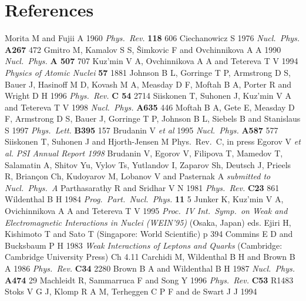 \documentclass[12pt]{iopart}
\begin{document}
\section*{References}
\begin{thebibliography}{99}
 Morita M and Fujii A 1960 {\em Phys.\ Rev.}  {\bf 118} 606
 Ciechanowicz S 1976 {\em Nucl.\ Phys.}  {\bf A267} 472
 Gmitro M, Kamalov S S, \v{S}imkovic F and
        Ovchinnikova A A 1990 {\em Nucl.\ Phys.} {\bf A 507} 707
 Kuz'min V A, Ovchinnikova A A and Tetereva T V 1994
        {\em Physics of Atomic Nuclei} {\bf 57} 1881
 Johnson B L, Gorringe T P, Armstrong D S,
        Bauer J, Hasinoff M D, Kovash M A, Measday D F,
        Moftah B A, Porter R and Wright D H 1996
        {\em Phys.\ Rev.} {\bf C 54} 2714
 Siiskonen T, Suhonen J, Kuz'min V A and Tetereva T V 1998
        {\em Nucl.\ Phys.}  {\bf A635} 446
 Moftah B A, Gete E, Measday D F, Armstrong D S,
        Bauer J, Gorringe T P, Johnson B L, Siebels B and
        Stanislaus S 1997 {\em Phys.\ Lett.} {\bf B395} 157
 Brudanin V {\it et al} 1995 {\em Nucl.\ Phys.} {\bf A587} 577
 Siiskonen T, Suhonen J and Hjorth-Jensen M
        {Phys.\ Rev.\ C, in press}
 Egorov V {\em et al.} {\em PSI Annual Report 1998}
 Brudanin V,
        Egorov V, Filipova T, Mamedov T,
        Salamatin A, Shitov Yu, Vylov Ts, Yutlandov I, Zaparov Sh,
        Deutsch J, Prieels R, Brian{\c c}on Ch, Kudoyarov M,
        Lobanov V and Pasternak A
        {\em submitted to Nucl.\ Phys.\  A}
 Parthasarathy R and Sridhar V N 1981 {\em Phys.\ Rev.}
        {\bf C23} 861
 Wildenthal B H 1984 {\em Prog.\ Part.\ Nucl.\ Phys.}  {\bf 11} 5
 Junker K, Kuz'min V A, Ovichinnikova A A and
        Tetereva T V 1995 {\em Proc.\ IV Int.\ Symp.\ on Weak and
        Electromagnetic Interactions in Nuclei (WEIN'95)} (Osaka, Japan)
        eds. Ejiri H, Kishimoto T and Sato T (Singapore: World Scientific) p 394
 Commins E D and Bucksbaum P H 1983 {\em Weak Interactions
        of Leptons and Quarks} (Cambridge: Cambridge University Press)
        Ch 4.11
 Carchidi M, Wildenthal B H and Brown B A 1986 {\em Phys.\ Rev.}
        {\bf C34} 2280
 Brown B A and Wildenthal B H 1987 {\em Nucl.\ Phys.} {\bf A474}
        29
 Machleidt R, Sammarruca F and Song Y 1996
        {\em Phys.\ Rev.} {\bf C53} R1483
 Stoks V G J, Klomp R A M, Terheggen C P F and de Swart J J 1994

\end{thebibliography}
\end{document}
